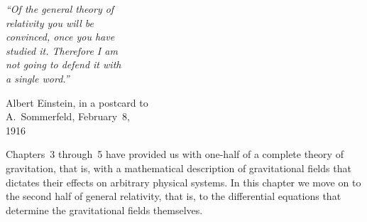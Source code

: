
\begin{flushleft}
\begin{minipage}{0.36\textwidth}
\itshape
``Of the general theory of\\
relativity you will be\\
convinced, once you have\\
studied it. Therefore I am\\
not going to defend it with\\
a single word.''

\medskip
\upshape
Albert Einstein, in a postcard to\\
A.~Sommerfeld, February~8,\\
1916
\end{minipage}
\end{flushleft}

Chapters~3 through~5 have provided us with one-half of a complete theory of
gravitation, that is, with a mathematical description of gravitational fields
that dictates their effects on arbitrary physical systems. In this chapter we
move on to the second half of general relativity, that is, to the differential
equations that determine the gravitational fields themselves.
